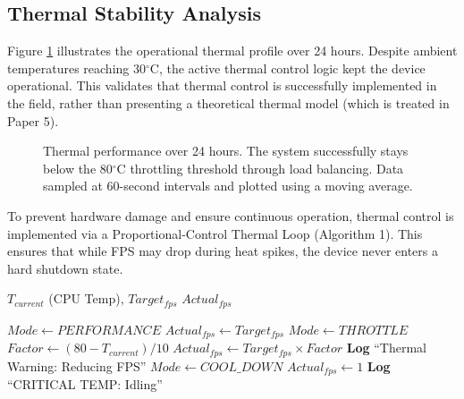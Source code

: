 \documentclass[conference]{IEEEtran}
\begin{document}
\subsection{Thermal Stability Analysis}
Figure \ref{fig:thermal} illustrates the operational thermal profile over 24 hours. Despite ambient temperatures reaching 30$^{\circ}$C, the active thermal control logic kept the device operational. This validates that thermal control is successfully implemented in the field, rather than presenting a theoretical thermal model (which is treated in Paper 5).



\begin{figure}[htbp]
\centering
{}
\caption{Thermal performance over 24 hours. The system successfully stays below the 80$^\circ$C throttling threshold through load balancing. Data sampled at 60-second intervals and plotted using a moving average.}
\label{fig:thermal}
\end{figure}

To prevent hardware damage and ensure continuous operation, thermal control is implemented via a Proportional-Control Thermal Loop (Algorithm 1). This ensures that while FPS may drop during heat spikes, the device never enters a hard shutdown state.

\begin{algorithm}
\caption{Dynamic Thermal Throttling Logic}
\begin{algorithmic}[1]
\REQUIRE $T_{current}$ (CPU Temp), $Target_{fps}$
\ENSURE $Actual_{fps}$

    \STATE $Mode \leftarrow PERFORMANCE$
    \STATE $Actual_{fps} \leftarrow Target_{fps}$
    \STATE $Mode \leftarrow THROTTLE$
    \STATE $Factor \leftarrow (80 - T_{current}) / 10$
    \STATE $Actual_{fps} \leftarrow Target_{fps} \times Factor$
    \STATE \textbf{Log} ``Thermal Warning: Reducing FPS''
\ELSE
    \STATE $Mode \leftarrow COOL\_DOWN$
    \STATE $Actual_{fps} \leftarrow 1$
    \STATE \textbf{Log} ``CRITICAL TEMP: Idling''
\ENDIF
\end{algorithmic}
\end{algorithm}
\end{document}
